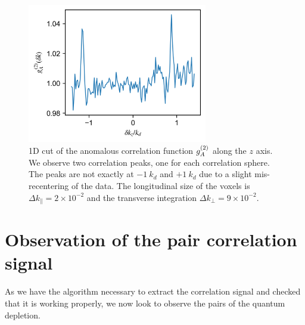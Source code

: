    
    



\begin{figure}
    \centering
    \includegraphics[width=0.7\textwidth]{Fig/Chapter4/kmk_kapitza.png}
    \caption{1D cut of the anomalous correlation function $g^{(2)}_A$ along the $z$ axis. We observe two correlation peaks, one for each correlation sphere. The peaks are not exactly at $-1 \ k_d$ and $+1 \ k_d$ due to a slight mis-recentering of the data. The longitudinal size of the voxels is $\Delta k_{\parallel}= 2 \times 10^{-2}$ and the transverse integration $\Delta k_{\perp}= 9 \times 10^{-2}$.}
    \label{fig:kmk_kapitza}
\end{figure}




\section{Observation of the pair correlation signal}

\label{sec:post_selec}

As we have the algorithm necessary to extract the correlation signal and checked that it is working properly, we now look to observe the \kmk pairs of the quantum depletion.

